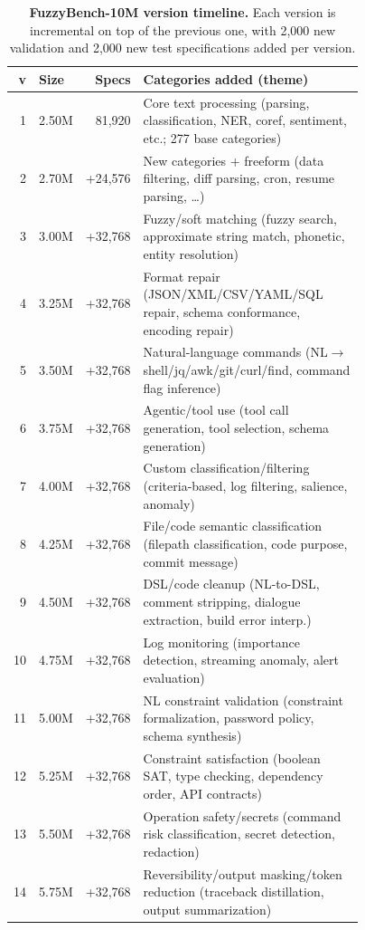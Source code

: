 \begin{table}[!h]
\centering
\caption{\label{tab:dataset_versions}\textbf{FuzzyBench-10M version timeline.} Each version is incremental on top of the previous one, with 2{,}000 new validation and 2{,}000 new test specifications added per version.}
\small
\setlength{\tabcolsep}{4pt}
\begin{tabular}{@{}rlr>{\raggedright\arraybackslash}p{0.77\linewidth}@{}}
\toprule
v & Size & Specs & Categories added (theme) \\
\midrule
1  & 2.50M & 81{,}920 & Core text processing (parsing, classification, NER, coref, sentiment, etc.; 277 base categories) \\
2  & 2.70M & +24{,}576 & New categories + freeform (data filtering, diff parsing, cron, resume parsing, \ldots) \\
3  & 3.00M & +32{,}768 & Fuzzy/soft matching (fuzzy search, approximate string match, phonetic, entity resolution) \\
4  & 3.25M & +32{,}768 & Format repair (JSON/XML/CSV/YAML/SQL repair, schema conformance, encoding repair) \\
5  & 3.50M & +32{,}768 & Natural-language commands (NL$\to$shell/jq/awk/git/curl/find, command flag inference) \\
6  & 3.75M & +32{,}768 & Agentic/tool use (tool call generation, tool selection, schema generation) \\
7  & 4.00M & +32{,}768 & Custom classification/filtering (criteria-based, log filtering, salience, anomaly) \\
8  & 4.25M & +32{,}768 & File/code semantic classification (filepath classification, code purpose, commit message) \\
9  & 4.50M & +32{,}768 & DSL/code cleanup (NL-to-DSL, comment stripping, dialogue extraction, build error interp.) \\
10 & 4.75M & +32{,}768 & Log monitoring (importance detection, streaming anomaly, alert evaluation) \\
11 & 5.00M & +32{,}768 & NL constraint validation (constraint formalization, password policy, schema synthesis) \\
12 & 5.25M & +32{,}768 & Constraint satisfaction (boolean SAT, type checking, dependency order, API contracts) \\
13 & 5.50M & +32{,}768 & Operation safety/secrets (command risk classification, secret detection, redaction) \\
14 & 5.75M & +32{,}768 & Reversibility/output masking/token reduction (traceback distillation, output summarization) \\

\end{tabular}
\end{table}
